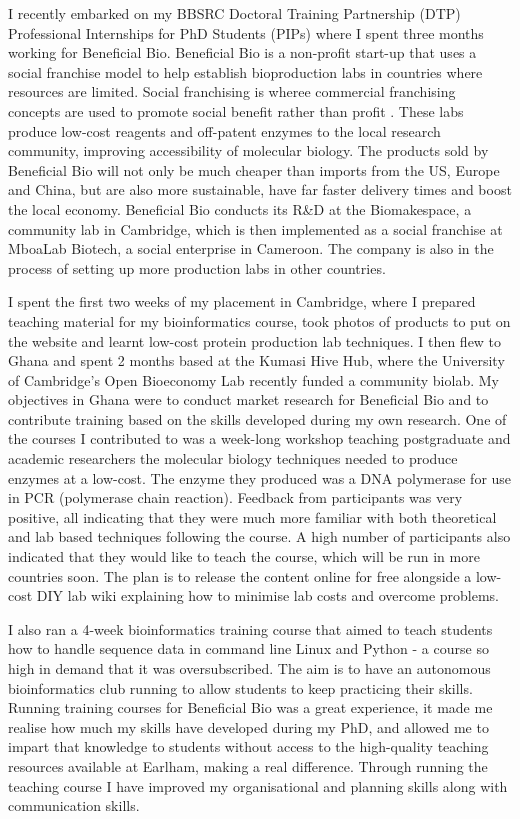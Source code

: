 I recently embarked on my BBSRC Doctoral Training Partnership (DTP)
Professional Internships for PhD Students (PIPs) where I spent three
months working for Beneficial Bio. Beneficial Bio is a non\hyp{}profit
start\hyp{}up that uses a social franchise model to help establish
bioproduction labs in countries where resources are limited.
Social franchising is wheree commercial franchising concepts are used to promote social benefit rather than profit \autocite{beyelerImpactClinicalSocial2013}.
These labs produce low\hyp{}cost reagents and off\hyp{}patent enzymes to the local research community, improving accessibility of molecular biology.
The products sold by Beneficial Bio will not only be much cheaper than imports from the US, Europe and China, but are also more sustainable, have far faster delivery times and boost the local economy.
Beneficial Bio conducts its R\&D at the Biomakespace, a community lab in Cambridge, which is then implemented as a social franchise at MboaLab Biotech, a social enterprise in Cameroon.
The company is also in the process of setting up more production labs in other countries.

I spent the first two weeks of my placement in Cambridge, where I
prepared teaching material for my bioinformatics course, took photos of
products to put on the website and learnt low\hyp{}cost protein production
lab techniques. I then flew to Ghana and spent 2 months based at the
Kumasi Hive Hub, where the University of Cambridge's Open Bioeconomy Lab
recently funded a community biolab. My objectives in Ghana were to
conduct market research for Beneficial Bio and to contribute training based on the skills developed during my own research.
One of the courses I contributed to was a week\hyp{}long workshop teaching postgraduate and academic researchers the molecular biology techniques needed to
produce enzymes at a low\hyp{}cost. The enzyme they produced was a DNA
polymerase for use in PCR (polymerase chain reaction). Feedback from
participants was very positive, all indicating that they were much more
familiar with both theoretical and lab based techniques following the
course. A high number of participants also indicated that they would
like to teach the course, which will be run in more countries soon. The
plan is to release the content online for free alongside a low\hyp{}cost DIY
lab wiki explaining how to minimise lab costs and overcome problems.

I also ran a 4\hyp{}week bioinformatics training course that aimed to teach
students how to handle sequence data in command line Linux and Python \hyp{}
a course so high in demand that it was oversubscribed. The aim is to
have an autonomous bioinformatics club running to allow students to keep
practicing their skills. Running training courses for Beneficial Bio was
a great experience, it made me realise how much my skills have developed
during my PhD, and allowed me to impart that knowledge to students
without access to the high\hyp{}quality teaching resources available at
Earlham, making a real difference. Through running the teaching course I
have improved my organisational and planning skills along with
communication skills.

